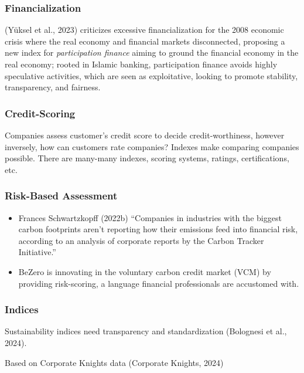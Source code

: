 \documentclass[
  letterpaper,
  DIV=11,
  numbers=noendperiod]{scrartcl}
\begin{document}
\subsubsection{Financialization}\label{financialization}

(Yüksel et al., 2023) criticizes excessive financialization for the 2008
economic crisis where the real economy and financial markets
disconnected, proposing a new index for \emph{participation finance}
aiming to ground the financial economy in the real economy; rooted in
Islamic banking, participation finance avoids highly speculative
activities, which are seen as exploitative, looking to promote
stability, transparency, and fairness.

\subsubsection{Credit-Scoring}\label{credit-scoring}

Companies assess customer's credit score to decide credit-worthiness,
however inversely, how can customers rate companies? Indexes make
comparing companies possible. There are many-many indexes, scoring
systems, ratings, certifications, etc.

\subsubsection{Risk-Based Assessment}\label{risk-based-assessment}

\begin{itemize}
\item
  Frances Schwartzkopff (2022b) ``Companies in industries with the
  biggest carbon footprints aren't reporting how their emissions feed
  into financial risk, according to an analysis of corporate reports by
  the Carbon Tracker Initiative.''
\item
  BeZero is innovating in the voluntary carbon credit market (VCM) by
  providing risk-scoring, a language financial professionals are
  accustomed with.
\end{itemize}

\subsubsection{Indices}\label{indices}

Sustainability indices need transparency and standardization (Bolognesi
et al., 2024).

Based on Corporate Knights data (Corporate Knights, 2024)
\end{document}
